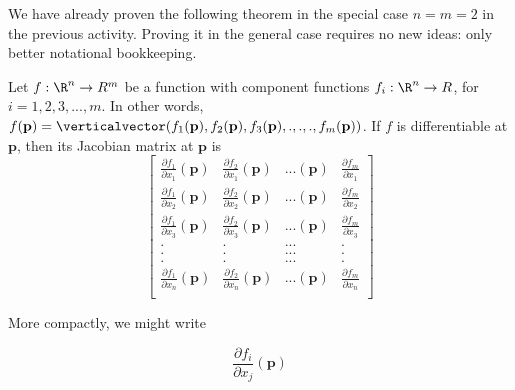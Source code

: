 \documentclass{ximera}
\begin{document}
	We have already proven the following theorem in the special case $n=m=2$ in the previous activity.  Proving it in the general case requires no new ideas: 
	 only better notational bookkeeping.
	
	\begin{theorem}
		Let $f:\R^n \to R^m$ be a function with component functions $f_i:\R^n \to R$, for $i=1,2,3,...,m$.  In other words,
		$f(\mathbf{p}) = \verticalvector(f_1(\mathbf{p}),f_2(\mathbf{p}),f_3(\mathbf{p}),.,.,., f_m(\mathbf{p}))$.  If $f$ is differentiable at $\mathbf{p}$,
		 then its Jacobian matrix at $\mathbf{p}$ is 
		  \[
		  \begin{bmatrix}
		  \frac{\partial f_1}{\partial x_1} \left(\mathbf{p}\right) & \frac{\partial f_2}{\partial x_1} \left(\mathbf{p}\right) & ...\left(\mathbf{p}\right) & \frac{\partial f_m}{\partial x_1} \\
		  \frac{\partial f_1}{\partial x_2} \left(\mathbf{p}\right) & \frac{\partial f_2}{\partial x_2} \left(\mathbf{p}\right) & ...\left(\mathbf{p}\right) & \frac{\partial f_m}{\partial x_2} \\
		  \frac{\partial f_1}{\partial x_3} \left(\mathbf{p}\right) & \frac{\partial f_2}{\partial x_3} \left(\mathbf{p}\right) & ...\left(\mathbf{p}\right) & \frac{\partial f_m}{\partial x_3} \\
		    .&.&...&.\\
		    .&.&...&.\\
		    .&.&...&.\\
		 \frac{\partial f_1}{\partial x_n} \left(\mathbf{p}\right) & \frac{\partial f_2}{\partial x_n} \left(\mathbf{p}\right) & ...\left(\mathbf{p}\right) & \frac{\partial f_m}{\partial x_n} \\
		  \end{bmatrix}
		  \]
		  
		  More compactly, we might write
		  
		  \[
		  	\frac{\partial f_i}{\partial x_j} \left( \mathbf{p} \right)
		  \]
		  

	\end{theorem}
	
\end{document}
